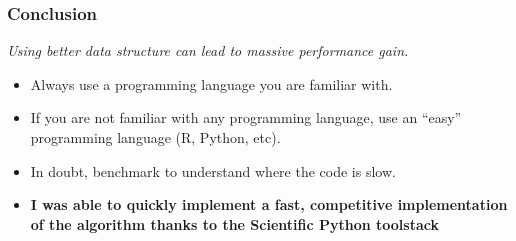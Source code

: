 \documentclass[xcolor=dvipsnames]{beamer}
\begin{document}
\begin{frame}
\frametitle{Conclusion}

{\Large \em Using better data structure can lead to massive performance gain.}

\vspace{1em}

\begin{itemize}[label={$\bullet$}]
\item Always use a programming language you are familiar with.
\item If you are not familiar with any programming language, use an ``easy''
programming language (R, Python, etc).
\item In doubt, benchmark to understand where the code is slow.
\item {\bf I was able to quickly implement a fast, competitive implementation
of the algorithm thanks to the Scientific Python toolstack}
\end{itemize}
\end{frame}
\end{document}
